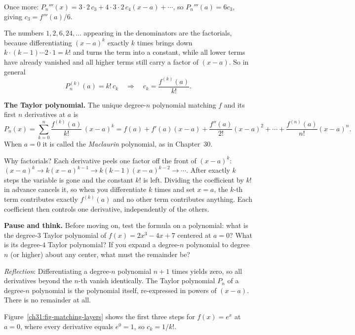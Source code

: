 Once more: $P_n'''(x) = 3\cdot 2\, c_3 + 4\cdot 3\cdot 2\, c_4 (x-a) + \cdots$, so
$P_n'''(a) = 6c_3$, giving $c_3 = f'''(a)/6$.

The numbers $1, 2, 6, 24, \dots$ appearing in the denominators are the factorials,
because differentiating $(x-a)^k$ exactly $k$ times brings
down $k \cdot (k-1) \cdots 2 \cdot 1 = k!$ and turns the term into a constant, while
all lower terms have already vanished and all higher terms still carry a factor of
$(x-a)$. So in general
\[
  P_n^{(k)}(a) = k!\, c_k \quad\Longrightarrow\quad c_k = \frac{f^{(k)}(a)}{k!}.
\]

\begin{focusbox}
\textbf{The Taylor polynomial.} The unique degree-$n$ polynomial matching $f$ and its
first $n$ derivatives at $a$ is
\[
  P_n(x) = \sum_{k=0}^{n} \frac{f^{(k)}(a)}{k!}\,(x-a)^k
  = f(a) + f'(a)(x-a) + \frac{f''(a)}{2!}(x-a)^2 + \cdots + \frac{f^{(n)}(a)}{n!}(x-a)^n.
\]
When $a=0$ it is called the \emph{Maclaurin} polynomial, as in Chapter~30.
\end{focusbox}

\begin{whybox}
Why factorials? Each derivative peels one factor off the front of $(x-a)^k$:
$(x-a)^k \to k(x-a)^{k-1} \to k(k-1)(x-a)^{k-2} \to \cdots$. After exactly $k$ steps
the variable is gone and the constant $k!$ is left. Dividing the coefficient by $k!$
in advance cancels it, so when you differentiate $k$ times and set $x=a$, the $k$-th
term contributes exactly $f^{(k)}(a)$ and no other term contributes anything. Each
coefficient then controls one derivative, independently of the others.
\end{whybox}

\begin{recoverybox}
\textbf{Pause and think.}
Before moving on, test the formula on a polynomial: what is the degree-$3$ Taylor polynomial
of $f(x) = 2x^3 - 4x + 7$ centered at $a = 0$? What is its degree-$4$ Taylor polynomial?
If you expand a degree-$n$ polynomial to degree $n$ (or higher) about any center, what must
the remainder be?

\emph{Reflection}: Differentiating a degree-$n$ polynomial $n+1$ times yields zero, so all
derivatives beyond the $n$-th vanish identically. The Taylor polynomial $P_n$ of a degree-$n$
polynomial is the polynomial itself, re-expressed in powers of $(x-a)$. There is no remainder at all.
\end{recoverybox}

Figure~\ref{ch31:fig-matching-layers} shows the first three steps for $f(x)=e^x$ at
$a=0$, where every derivative equals $e^0 = 1$, so $c_k = 1/k!$.

